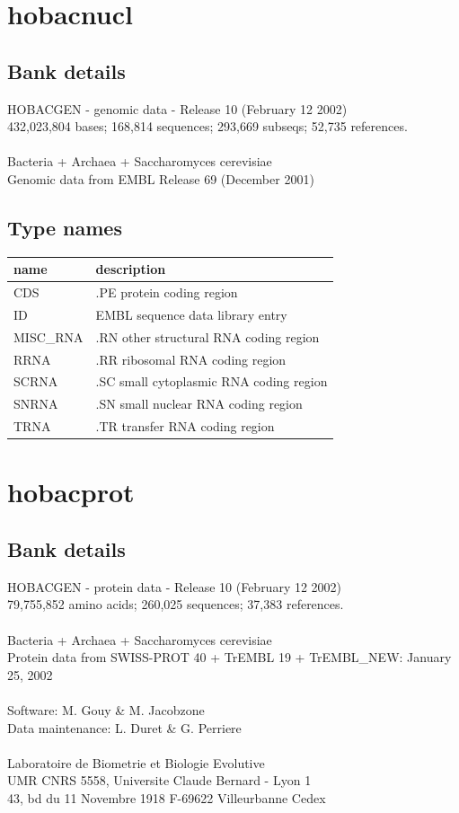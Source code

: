 \documentclass{article}
\begin{document}
\begin{Schunk}
\section{ hobacnucl }
\subsection{Bank details}
HOBACGEN - genomic data - Release 10 (February 12 2002)\\
432,023,804 bases; 168,814 sequences; 293,669 subseqs; 52,735 references.\\
\\
Bacteria + Archaea + Saccharomyces cerevisiae\\
Genomic data from EMBL Release 69 (December 2001)\\


\subsection{Type names}
\noindent\begin{tabular}{ll}
\hline \hline
name & description\\
\hline
CDS & .PE protein coding region \\
ID & EMBL sequence data library entry \\
MISC\_RNA & .RN other structural RNA coding region \\
RRNA & .RR ribosomal RNA coding region \\
SCRNA & .SC small cytoplasmic RNA coding region \\
SNRNA & .SN small nuclear RNA coding region \\
TRNA & .TR transfer RNA coding region \\
\hline \hline
\end{tabular}

\section{ hobacprot }
\subsection{Bank details}
HOBACGEN - protein data - Release 10 (February 12 2002)\\
79,755,852 amino acids; 260,025 sequences; 37,383 references.\\
\\
Bacteria + Archaea + Saccharomyces cerevisiae\\
Protein data from SWISS-PROT 40 + TrEMBL 19 + TrEMBL\_NEW: January 25, 2002\\
\\
Software: M. Gouy \& M. Jacobzone\\
Data maintenance: L. Duret \& G. Perriere\\
\\
Laboratoire de Biometrie et Biologie Evolutive\\
UMR CNRS 5558, Universite Claude Bernard - Lyon 1\\
43, bd du 11 Novembre 1918 F-69622 Villeurbanne Cedex\\



\end{Schunk}
\end{document}
